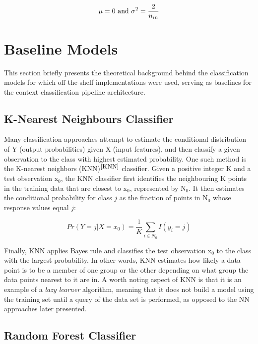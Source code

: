 \begin{equation}
  \centering
  \mu = 0 \ \text{and} \ \sigma^2 = \frac{2}{n_{in}}
\end{equation}

\section{Baseline Models}

This section briefly presents the theoretical background behind the classification models for which off-the-shelf implementations were used, serving as baselines for the context classification pipeline architecture. 

\subsection{K-Nearest Neighbours Classifier}
Many classification approaches attempt to estimate the conditional distribution of Y (output probabilities) given X (input features), and then classify a given observation to the class with highest estimated probability. One such method is the K-nearest neighbors (KNN)$^{\small \cite{KNN}}$ classifier. Given a positive integer K and a test observation x$_0$, the KNN classifier first identifies the neighbouring K points in the training data that are closest to x$_0$, represented by N$_0$. It then estimates the conditional probability for class $j$ as the fraction of points in N$_0$ whose response values equal $j$:

\begin{equation}
    Pr(Y = j|X = x_0) = \frac{1}{K} \sum_{i \in N_0} I(y_i = j)
\end{equation}

Finally, KNN applies Bayes rule and classifies the test observation x$_0$ to
the class with the largest probability. In other words, KNN estimates how likely a data point is to be a member of one group or the other depending on what group the data points nearest to it are in. A worth noting aspect of KNN is that it is an example of a \textit{lazy learner} algorithm, meaning that it does not build a model using the training set until a query of the data set is performed, as opposed to the NN approaches later presented. 




\subsection{Random Forest Classifier}

